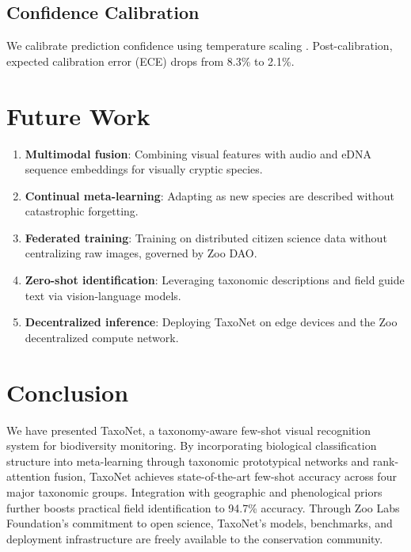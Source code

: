 \documentclass[11pt,a4paper]{article}
\begin{document}
\subsection{Confidence Calibration}

We calibrate prediction confidence using temperature scaling
\citep{guo2017calibration}. Post-calibration, expected calibration error
(ECE) drops from 8.3\% to 2.1\%.


\section{Future Work}
\label{sec:future}

\begin{enumerate}
  \item \textbf{Multimodal fusion}: Combining visual features with audio
    and eDNA sequence embeddings for visually cryptic species.
  \item \textbf{Continual meta-learning}: Adapting as new species are
    described without catastrophic forgetting.
  \item \textbf{Federated training}: Training on distributed citizen
    science data without centralizing raw images, governed by Zoo DAO.
  \item \textbf{Zero-shot identification}: Leveraging taxonomic
    descriptions and field guide text via vision-language models.
  \item \textbf{Decentralized inference}: Deploying TaxoNet on edge
    devices and the Zoo decentralized compute network.
\end{enumerate}


\section{Conclusion}
\label{sec:conclusion}

We have presented TaxoNet, a taxonomy-aware few-shot visual recognition
system for biodiversity monitoring. By incorporating biological
classification structure into meta-learning through taxonomic prototypical
networks and rank-attention fusion, TaxoNet achieves state-of-the-art
few-shot accuracy across four major taxonomic groups. Integration with
geographic and phenological priors further boosts practical field
identification to 94.7\% accuracy. Through Zoo Labs Foundation's
commitment to open science, TaxoNet's models, benchmarks, and deployment
infrastructure are freely available to the conservation community.
\end{document}
